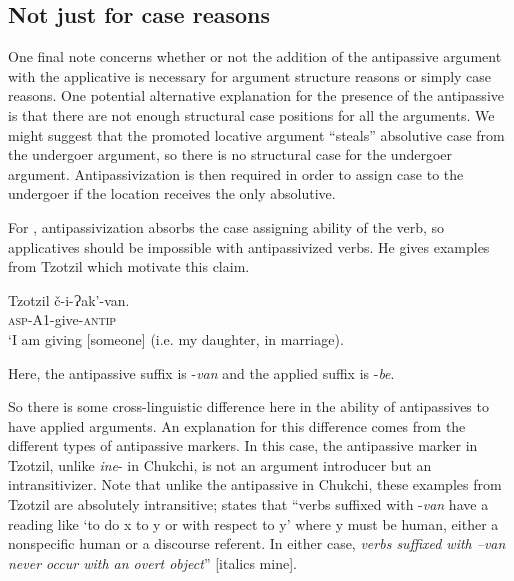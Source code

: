 \documentclass[output=paper,colorlinks,citecolor=brown,modfonts,nonflat]{langsci/langscibook}
\begin{document}
\subsection{Not just for case reasons} %

One final note concerns whether or not the addition of the antipassive argument with the applicative is necessary for argument structure reasons or simply case reasons. One potential alternative explanation for the presence of the antipassive is that there are not enough structural case positions for all the arguments. We might suggest that the promoted locative argument ``steals'' absolutive case from the undergoer argument, so there is no structural case for the undergoer argument. Antipassivization is then required in order to assign case to the undergoer if the location receives the only absolutive.

For \citet{Baker1988}, antipassivization absorbs the case assigning ability of the verb, so applicatives should be impossible with antipassivized verbs. He gives examples from Tzotzil which motivate this claim.\textstyleEndnoteSymbol{}

\ea%
    Tzotzil \citep{Aissen1983} \label{ex:basilico:15}
    \ea \label{ex:basilico:15a}
    \gll č-i-Ɂak’-van.\\
    \textsc{asp}{}-A1-give{}-\textsc{antip}\\
    \glt `I am giving [someone] (i.e. my daughter, in marriage).

    \z
    \z


Here, the antipassive suffix is -\textit{van} and the applied suffix is -\textit{be}.

So there is some cross-linguistic difference here in the ability of antipassives to have applied arguments. An explanation for this difference comes from the different types of antipassive markers. In this case, the antipassive marker in Tzotzil, unlike \textit{ine}{}- in Chukchi, is not an argument introducer but an intransitivizer. Note that unlike the antipassive in Chukchi, these examples from Tzotzil are absolutely intransitive; \citet[291]{Aissen1983}  states that “verbs suffixed with -\textit{van} have a reading like ‘to do x to y or with respect to y’ where y must be human, either a nonspecific human or a discourse referent. In either case, \textit{verbs suffixed with –van never occur with an overt object}” [italics mine].
\end{document}
